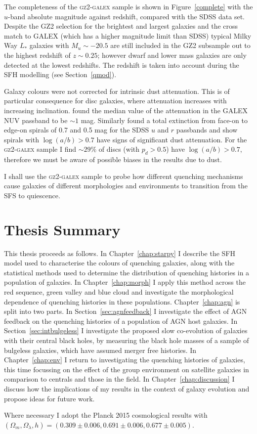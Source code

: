 The completeness of the \textsc{gz2-galex} sample is shown in Figure~\ref{complete} with the $u$-band absolute magnitude against redshift, compared with the SDSS data set. Despite the GZ2 selection for the brightest and largest galaxies and the cross match to GALEX (which has a higher magnitude limit than SDSS) typical Milky Way $L_*$ galaxies with $M_u \sim -20.5$ are still included in the GZ2 subsample out to the highest redshift of $z \sim 0.25$; however dwarf and lower mass galaxies are only detected at the lowest redshifts. The redshift is taken into account during the SFH modelling (see Section~\ref{qmod}).

Galaxy colours were not corrected for intrinsic dust attenuation. This is of particular consequence for disc galaxies, where attenuation increases with increasing inclination. \cite{Buat05} found the median value of the attenuation in the GALEX NUV passband to be $\sim 1$ mag. Similarly \cite{masters10a} found a total extinction from face-on to edge-on spirals of 0.7 and 0.5 mag for the SDSS $u$ and $r$ passbands and show spirals with $\log(a/b) > 0.7$ have signs of significant dust attenuation. For the \textsc{gz2-galex} sample I find $\sim29\%$ of discs (with $p_d > 0.5$) have $\log(a/b) > 0.7$, therefore we must be aware of possible biases in the results due to dust. 

I shall use the \textsc{gz2-galex} sample to probe how different quenching mechanisms cause galaxies of different morphologies and environments to transition from the SFS to quiescence. 


\section{Thesis Summary}\label{sec:thesissum}


This thesis proceeds as follows. In Chapter~\ref{chap:starpy} I describe the SFH model used to characterise the colours of quenching galaxies, along with the statistical methods used to determine the distribution of quenching histories in a population of galaxies. In Chapter~\ref{chap:morph} I apply this method across the red sequence, green valley and blue cloud and investigate the morphological dependence of quenching histories in these populations. Chapter~\ref{chap:agn} is split into two parts. In Section~\ref{sec:agnfeedback} I investigate the effect of AGN feedback on the quenching histories of a  population of AGN host galaxies. In Section~\ref{sec:intbulgeless} I investigate the proposed slow co-evolution of galaxies with their central black holes, by measuring the black hole masses of a sample of bulgeless galaxies, which have assumed merger free histories. In Chapter~\ref{chap:env} I return to investigating the quenching histories of galaxies, this time focussing on the effect of the group environment on satellite galaxies in comparison to centrals and those in the field. In Chapter~\ref{chap:discussion} I discuss how the implications of my results in the context of galaxy evolution and propose ideas for future work.

Where necessary I adopt the Planck 2015 cosmological results \citep{planck16} with $(\Omega_m, \Omega_{\lambda}, h) = (0.309 \pm 0.006, 0.691 \pm 0.006, 0.677 \pm 0.005)$. 
